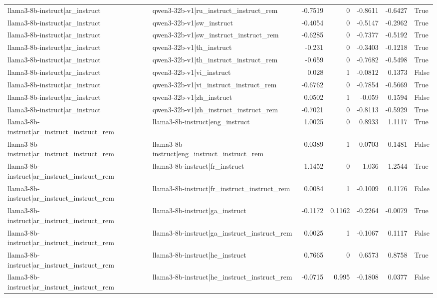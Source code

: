 \begin{table}
\begin{tabular}{l l r r r r l}
llama3-8b-instruct|ar_instruct & qwen3-32b-v1|ru_instruct_instruct_rem & -0.7519 & 0 & -0.8611 & -0.6427 & True \\
llama3-8b-instruct|ar_instruct & qwen3-32b-v1|sw_instruct & -0.4054 & 0 & -0.5147 & -0.2962 & True \\
llama3-8b-instruct|ar_instruct & qwen3-32b-v1|sw_instruct_instruct_rem & -0.6285 & 0 & -0.7377 & -0.5192 & True \\
llama3-8b-instruct|ar_instruct & qwen3-32b-v1|th_instruct & -0.231 & 0 & -0.3403 & -0.1218 & True \\
llama3-8b-instruct|ar_instruct & qwen3-32b-v1|th_instruct_instruct_rem & -0.659 & 0 & -0.7682 & -0.5498 & True \\
llama3-8b-instruct|ar_instruct & qwen3-32b-v1|vi_instruct & 0.028 & 1 & -0.0812 & 0.1373 & False \\
llama3-8b-instruct|ar_instruct & qwen3-32b-v1|vi_instruct_instruct_rem & -0.6762 & 0 & -0.7854 & -0.5669 & True \\
llama3-8b-instruct|ar_instruct & qwen3-32b-v1|zh_instruct & 0.0502 & 1 & -0.059 & 0.1594 & False \\
llama3-8b-instruct|ar_instruct & qwen3-32b-v1|zh_instruct_instruct_rem & -0.7021 & 0 & -0.8113 & -0.5929 & True \\
llama3-8b-instruct|ar_instruct_instruct_rem & llama3-8b-instruct|eng_instruct & 1.0025 & 0 & 0.8933 & 1.1117 & True \\
llama3-8b-instruct|ar_instruct_instruct_rem & llama3-8b-instruct|eng_instruct_instruct_rem & 0.0389 & 1 & -0.0703 & 0.1481 & False \\
llama3-8b-instruct|ar_instruct_instruct_rem & llama3-8b-instruct|fr_instruct & 1.1452 & 0 & 1.036 & 1.2544 & True \\
llama3-8b-instruct|ar_instruct_instruct_rem & llama3-8b-instruct|fr_instruct_instruct_rem & 0.0084 & 1 & -0.1009 & 0.1176 & False \\
llama3-8b-instruct|ar_instruct_instruct_rem & llama3-8b-instruct|ga_instruct & -0.1172 & 0.1162 & -0.2264 & -0.0079 & True \\
llama3-8b-instruct|ar_instruct_instruct_rem & llama3-8b-instruct|ga_instruct_instruct_rem & 0.0025 & 1 & -0.1067 & 0.1117 & False \\
llama3-8b-instruct|ar_instruct_instruct_rem & llama3-8b-instruct|he_instruct & 0.7665 & 0 & 0.6573 & 0.8758 & True \\
llama3-8b-instruct|ar_instruct_instruct_rem & llama3-8b-instruct|he_instruct_instruct_rem & -0.0715 & 0.995 & -0.1808 & 0.0377 & False \\

\end{tabular}
\end{table}
